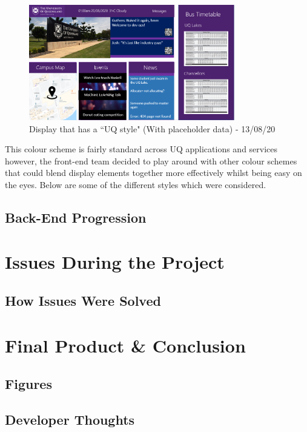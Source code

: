 \documentclass{article}
\begin{document}
		\begin{figure}[h!]
			\centering
			\includegraphics[width=0.8\textwidth]{Figures/UQlike2.png}
			\caption{Display that has a ``UQ style" (With placeholder data) - 13/08/20}
			\label{UQlike2}
		\end{figure}
		This colour scheme is fairly standard across UQ applications and services however, the front-end team decided to play around with other colour schemes that could blend display elements together more effectively whilst being easy on the eyes. Below are some of the different styles which were considered.
	
	\subsection{Back-End Progression}
		
	
\section{Issues During the Project}
	
	\subsection{How Issues Were Solved}

\section{Final Product \& Conclusion}
	
	\subsection{Figures}
	
	\subsection{Developer Thoughts}
\end{document}
